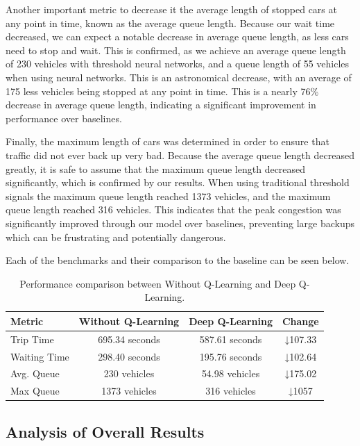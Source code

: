 \documentclass[conference]{IEEEtran}
\begin{document}
Another important metric to decrease it the average length of stopped cars at any point in time, known as the average queue length. Because our wait time decreased, we can expect a notable decrease in average queue length, as less cars need to stop and wait. This is confirmed, as we achieve an average queue length of 230 vehicles with threshold neural networks, and a queue length of 55 vehicles when using neural networks. This is an astronomical decrease, with an average of 175 less vehicles being stopped at any point in time.  This is a nearly 76\% decrease in average queue length, indicating a significant improvement in performance over baselines. 

Finally, the maximum length of cars was determined in order to ensure that traffic did not ever back up very bad. Because the average queue length decreased greatly, it is safe to assume that the maximum queue length decreased significantly, which is confirmed by our results. When using traditional threshold signals the maximum queue length reached 1373 vehicles, and the maximum queue length reached 316 vehicles. This indicates that the peak congestion was significantly improved through our model over baselines, preventing large backups which can be frustrating and potentially dangerous.

Each of the benchmarks and their comparison to the baseline can be seen below. 

\begin{table}[H]
\centering
\begin{tabular}{|l|c|c|c|}
\hline
\textbf{Metric} & \textbf{Without Q-Learning} & \textbf{Deep Q-Learning} & \textbf{Change} \\
\hline
Trip Time & 695.34 seconds & 587.61 seconds & ↓107.33 \\
\hline
Waiting Time & 298.40 seconds & 195.76 seconds & ↓102.64 \\
\hline
Avg. Queue& 230 vehicles & 54.98 vehicles & ↓175.02 \\
\hline
Max Queue & 1373 vehicles & 316 vehicles & ↓1057 \\
\hline
\end{tabular}
\caption{Performance comparison between Without Q-Learning and Deep Q-Learning.}
\label{tab:comparison}
\end{table}

\subsection{Analysis of Overall Results}
\end{document}

